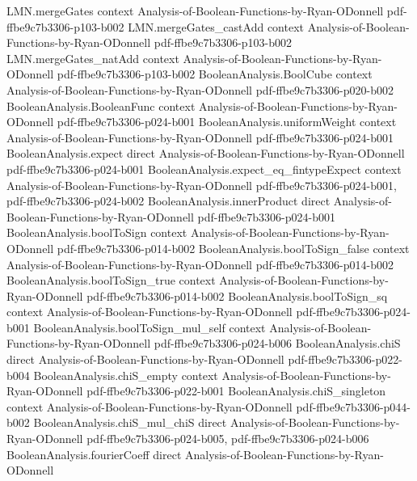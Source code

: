 \begin{lemma}
\proofstep
  {LMN.mergeGates}
  {context}
  {Analysis-of-Boolean-Functions-by-Ryan-ODonnell}
  {pdf-ffbe9c7b3306-p103-b002}
\proofstep
  {LMN.mergeGates_castAdd}
  {context}
  {Analysis-of-Boolean-Functions-by-Ryan-ODonnell}
  {pdf-ffbe9c7b3306-p103-b002}
\proofstep
  {LMN.mergeGates_natAdd}
  {context}
  {Analysis-of-Boolean-Functions-by-Ryan-ODonnell}
  {pdf-ffbe9c7b3306-p103-b002}
\proofstep
  {BooleanAnalysis.BoolCube}
  {context}
  {Analysis-of-Boolean-Functions-by-Ryan-ODonnell}
  {pdf-ffbe9c7b3306-p020-b002}
\proofstep
  {BooleanAnalysis.BooleanFunc}
  {context}
  {Analysis-of-Boolean-Functions-by-Ryan-ODonnell}
  {pdf-ffbe9c7b3306-p024-b001}
\proofstep
  {BooleanAnalysis.uniformWeight}
  {context}
  {Analysis-of-Boolean-Functions-by-Ryan-ODonnell}
  {pdf-ffbe9c7b3306-p024-b001}
\proofstep
  {BooleanAnalysis.expect}
  {direct}
  {Analysis-of-Boolean-Functions-by-Ryan-ODonnell}
  {pdf-ffbe9c7b3306-p024-b001}
\proofstep
  {BooleanAnalysis.expect_eq_fintypeExpect}
  {context}
  {Analysis-of-Boolean-Functions-by-Ryan-ODonnell}
  {pdf-ffbe9c7b3306-p024-b001,
    pdf-ffbe9c7b3306-p024-b002}
\proofstep
  {BooleanAnalysis.innerProduct}
  {direct}
  {Analysis-of-Boolean-Functions-by-Ryan-ODonnell}
  {pdf-ffbe9c7b3306-p024-b001}
\proofstep
  {BooleanAnalysis.boolToSign}
  {context}
  {Analysis-of-Boolean-Functions-by-Ryan-ODonnell}
  {pdf-ffbe9c7b3306-p014-b002}
\proofstep
  {BooleanAnalysis.boolToSign_false}
  {context}
  {Analysis-of-Boolean-Functions-by-Ryan-ODonnell}
  {pdf-ffbe9c7b3306-p014-b002}
\proofstep
  {BooleanAnalysis.boolToSign_true}
  {context}
  {Analysis-of-Boolean-Functions-by-Ryan-ODonnell}
  {pdf-ffbe9c7b3306-p014-b002}
\proofstep
  {BooleanAnalysis.boolToSign_sq}
  {context}
  {Analysis-of-Boolean-Functions-by-Ryan-ODonnell}
  {pdf-ffbe9c7b3306-p024-b001}
\proofstep
  {BooleanAnalysis.boolToSign_mul_self}
  {context}
  {Analysis-of-Boolean-Functions-by-Ryan-ODonnell}
  {pdf-ffbe9c7b3306-p024-b006}
\proofstep
  {BooleanAnalysis.chiS}
  {direct}
  {Analysis-of-Boolean-Functions-by-Ryan-ODonnell}
  {pdf-ffbe9c7b3306-p022-b004}
\proofstep
  {BooleanAnalysis.chiS_empty}
  {context}
  {Analysis-of-Boolean-Functions-by-Ryan-ODonnell}
  {pdf-ffbe9c7b3306-p022-b001}
\proofstep
  {BooleanAnalysis.chiS_singleton}
  {context}
  {Analysis-of-Boolean-Functions-by-Ryan-ODonnell}
  {pdf-ffbe9c7b3306-p044-b002}
\proofstep
  {BooleanAnalysis.chiS_mul_chiS}
  {direct}
  {Analysis-of-Boolean-Functions-by-Ryan-ODonnell}
  {pdf-ffbe9c7b3306-p024-b005,
    pdf-ffbe9c7b3306-p024-b006}
\proofstep
  {BooleanAnalysis.fourierCoeff}
  {direct}
  {Analysis-of-Boolean-Functions-by-Ryan-ODonnell}

\end{lemma}
